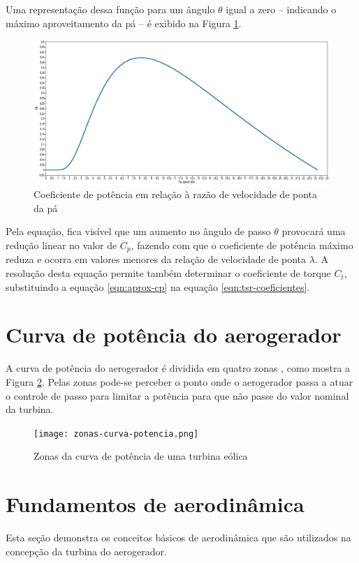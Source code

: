 \documentclass{article}
\begin{document}
	Uma representação dessa função para um ângulo $\theta$ igual a zero -- indicando o máximo aproveitamento da pá -- é exibido na Figura \ref{fig:curva-cp-lambda}.
	\begin{figure}[ht]
		\centering
		\includegraphics[scale=0.28]{curva-cp-lambda}
		\caption{Coeficiente de potência em relação à razão de velocidade de ponta da pá}
		\label{fig:curva-cp-lambda}
	\end{figure}

	Pela equação, fica visível que um aumento no ângulo de passo $\theta$ provocará uma redução linear no valor de $C_p$, fazendo com que o coeficiente de potência máximo reduza e ocorra em valores menores da relação de velocidade de ponta $\lambda$.
	A resolução desta equação permite também determinar o coeficiente de torque $C_t$, substituindo a equação \ref{eqn:aprox-cp} na equação \ref{eqn:tsr-coeficientes}.
	
	\section{Curva de potência do aerogerador}
	A curva de potência do aerogerador é dividida em quatro zonas \cite{pinto:2014}, como mostra a Figura \ref{fig:zonas-curva-potencia}.
	Pelas zonas pode-se perceber o ponto onde o aerogerador passa a atuar o controle de passo para limitar a potência para que não passe do valor nominal da turbina.
	\begin{figure}[ht]
		\centering
		\texttt{[image: zonas-curva-potencia.png]}
		\caption{Zonas da curva de potência de uma turbina eólica}
		\label{fig:zonas-curva-potencia}
	\end{figure}

	\section{Fundamentos de aerodinâmica}
	Esta seção demonstra os conceitos básicos de aerodinâmica que são utilizados na concepção da turbina do aerogerador.
\end{document}
